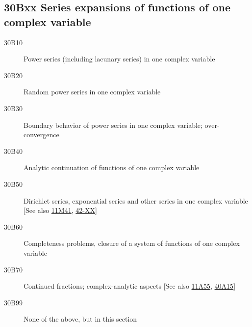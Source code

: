 \subsection*{30Bxx  Series expansions of functions of one complex variable }\label{30Bxx}
\begin{description}  
\item [30B10]\label{30B10} Power series (including lacunary series) in one complex variable 
\item [30B20]\label{30B20} Random power series in one complex variable
\item [30B30]\label{30B30} Boundary behavior of power series in one complex variable; over-convergence
\item [30B40]\label{30B40} Analytic continuation of  functions of one complex variable 
\item [30B50]\label{30B50} Dirichlet series,  exponential series and other series  in one complex variable [See also \hyperref[11M41]{11M41}, \hyperref[42-XX]{42-XX}]
\item [30B60]\label{30B60} Completeness problems, closure of a system of functions of one complex variable
\item [30B70]\label{30B70} Continued fractions; complex-analytic aspects [See also \hyperref[11A55]{11A55}, \hyperref[40A15]{40A15}]
\item [30B99]\label{30B99} None of the above, but in this section
\end{description}
